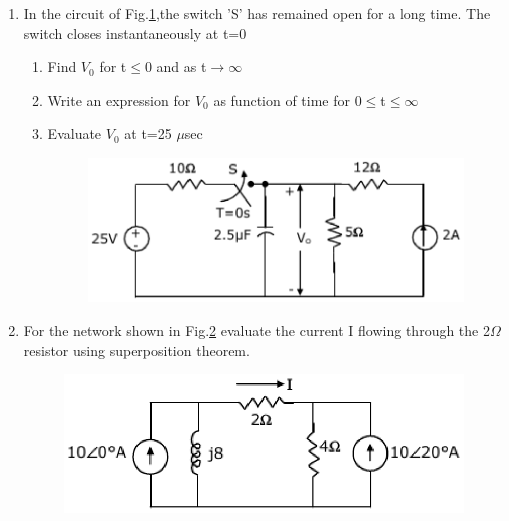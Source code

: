 \documentclass[journal,12pt,twocolumn]{IEEEtran}
\begin{document}
\begin{enumerate}
\item In the circuit of Fig.\ref{fig28},the switch 'S' has remained open for a long time. The switch closes instantaneously at t=0
\begin{enumerate}
\setlength\itemsep{2em}
\item Find $V_{0}$ for t$\leq$0 and as t$\rightarrow\infty$
\item Write an expression for $V_{0}$ as function of time for 0$\leq$t$\leq\infty$
\item Evaluate $V_{0}$ at t=25 $\mu$sec
\begin{figure}[!h]
\begin{center}
\includegraphics[scale=0.5]{./figs/fig28.eps}
\caption{}
\label{fig28}
\end{center}
\end{figure}
\end{enumerate}

\item For the network shown in Fig.\ref{fig29} evaluate the  current I flowing through the 2$\Omega$ resistor using superposition theorem.
\begin{figure}[!h]
\begin{center}
\includegraphics[scale=0.5]{./figs/fig29.eps}
\caption{}
\label{fig29}
\end{center}
\end{figure}



\end{enumerate}
\end{document}
